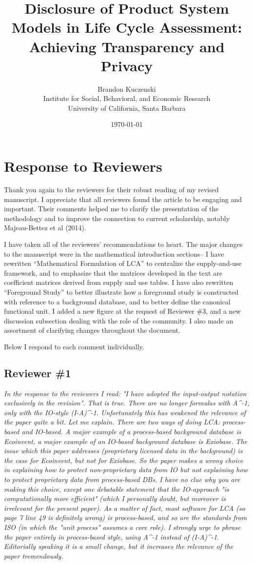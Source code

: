 \documentclass[11pt,letterpaper]{article}
\title{Disclosure of Product System Models in Life Cycle Assessment: Achieving Transparency and Privacy}
\author{Brandon Kuczenski\\
Institute for Social, Behavioral, and Economic Research\\
University of California, Santa Barbara}
\date{\mydate\today}
\begin{document}
\maketitle

\section*{Response to Reviewers}

Thank you again to the reviewers for their robust reading of my revised manuscript.  I appreciate that all reviewers found the article to be engaging and important.  Their comments helped me to clarify the presentation of the methodology and to improve the connection to current scholarship, notably Majeau-Bettez et al (2014).  

I have taken all of the reviewers' recommendations to heart.  The major changes to the manuscript were in the mathematical introduction sections-- I have rewritten ``Mathematical Formulation of LCA'' to centralize the supply-and-use framework, and to emphasize that the matrices developed in the text are coefficient matrices derived from supply and use tables.  I have also rewritten ``Foreground Study'' to better illustrate how a foreground study is constructed with reference to a background database, and to better define the canonical functional unit.  I added a new figure at the request of Reviewer \#3, and a new discussion subsection dealing with the role of the community.  I also made an assortment of clarifying changes throughout the document. 

Below I respond to each comment individually.

\subsection*{Reviewer \#1}

\emph{In the response to the reviewers I read: "I have adopted the input-output notation exclusively in the revision". That is true. There are no longer formulas with A\^{}-1, only with the IO-style (I-A)\^{}-1. Unfortunately this has weakened the relevance of the paper quite a bit. Let me explain. There are two ways of doing LCA: process-based and IO-based.  A major example of a process-based background database is Ecoinvent, a major example of an IO-based background database is Exiobase. The issue which this paper addresses (proprietary licensed data in the background) is the case for Ecoinvent, but not for Exiobase. So the paper makes a wrong choice in explaining how to protect non-proprietary data from IO but not explaining how to protect proprietary data from process-based DBs. I have no clue why you are making this choice, except one debatable statement that the IO-approach "is computationally more efficient" (which I personally doubt, but moreover is irrelevant for the present paper). As a matter of fact, most software for LCA (so page 7 line 49 is definitely wrong) is process-based, and so are the standards from ISO (in which the "unit process" assumes a core role). I strongly urge to phrase the paper entirely in process-based style, using A\^{}-1 instead of (I-A)\^{}-1. Editorially speaking it is a small change, but it increases the relevance of the paper tremendously.}
\end{document}
